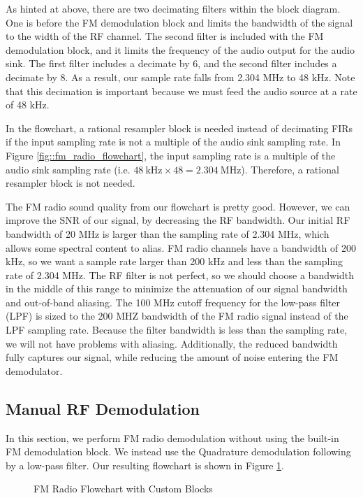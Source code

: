\documentclass{article}
\begin{document}
As hinted at above, there are two decimating filters within the block diagram. One is before the FM demodulation block and limits the bandwidth of the signal to the width of the RF channel. The second filter is included with the FM demodulation block, and it limits the frequency of the audio output for the audio sink. The first filter includes a decimate by 6, and the second filter includes a decimate by 8. As a result, our sample rate falls from 2.304 MHz to 48 kHz. Note that this decimation is important because we must feed the audio source at a rate of 48 kHz.

In the flowchart, a rational resampler block is needed instead of decimating FIRs if the input sampling rate is not a multiple of the audio sink sampling rate. In Figure \ref{fig::fm_radio_flowchart}, the input sampling rate is a multiple of the audio sink sampling rate (i.e. $48\ \text{kHz} \times 48 = 2.304\ \text{MHz}$). Therefore, a rational resampler block is not needed.

The FM radio sound quality from our flowchart is pretty good. However, we can improve the SNR of our signal, by decreasing the RF bandwidth. Our initial RF bandwidth of 20 MHz is larger than the sampling rate of 2.304 MHz, which allows some spectral content to alias. FM radio channels have a bandwidth of 200 kHz, so we want a sample rate larger than 200 kHz and less than the sampling rate of 2.304 MHz. The RF filter is not perfect, so we should choose a bandwidth in the middle of this range to minimize the attenuation of our signal bandwidth and out-of-band aliasing. The 100 MHz cutoff frequency for the low-pass filter (LPF) is sized to the 200 MHZ bandwidth of the FM radio signal instead of the LPF sampling rate. Because the filter bandwidth is less than the sampling rate, we will not have problems with aliasing. Additionally, the reduced bandwidth fully captures our signal, while reducing the amount of noise entering the FM demodulator.

\subsection{Manual RF Demodulation}

In this section, we perform FM radio demodulation without using the built-in FM demodulation block. We instead use the Quadrature demodulation following by a low-pass filter. Our resulting flowchart is shown in Figure \ref{fig::fm_radio_user_flowchart}.

\begin{figure}[H]
	\centerline{}
	\caption{FM Radio Flowchart with Custom Blocks}
	\label{fig::fm_radio_user_flowchart}
\end{figure}
\end{document}
